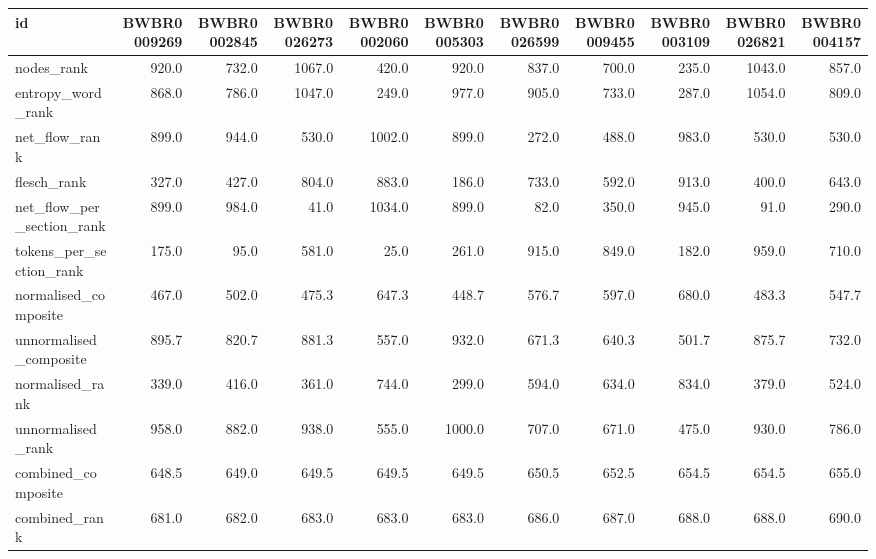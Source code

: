 \begin{tabular}{lrrrrrrrrrr}
\toprule
id & BWBR0009269 & BWBR0002845 & BWBR0026273 & BWBR0002060 & BWBR0005303 & BWBR0026599 & BWBR0009455 & BWBR0003109 & BWBR0026821 & BWBR0004157 \\
\midrule
nodes\_rank & 920.0 & 732.0 & 1067.0 & 420.0 & 920.0 & 837.0 & 700.0 & 235.0 & 1043.0 & 857.0 \\
\cline{1-11}
entropy\_word\_rank & 868.0 & 786.0 & 1047.0 & 249.0 & 977.0 & 905.0 & 733.0 & 287.0 & 1054.0 & 809.0 \\
\cline{1-11}
net\_flow\_rank & 899.0 & 944.0 & 530.0 & 1002.0 & 899.0 & 272.0 & 488.0 & 983.0 & 530.0 & 530.0 \\
\cline{1-11}
flesch\_rank & 327.0 & 427.0 & 804.0 & 883.0 & 186.0 & 733.0 & 592.0 & 913.0 & 400.0 & 643.0 \\
\cline{1-11}
net\_flow\_per\_section\_rank & 899.0 & 984.0 & 41.0 & 1034.0 & 899.0 & 82.0 & 350.0 & 945.0 & 91.0 & 290.0 \\
\cline{1-11}
tokens\_per\_section\_rank & 175.0 & 95.0 & 581.0 & 25.0 & 261.0 & 915.0 & 849.0 & 182.0 & 959.0 & 710.0 \\
\cline{1-11}
normalised\_composite & 467.0 & 502.0 & 475.3 & 647.3 & 448.7 & 576.7 & 597.0 & 680.0 & 483.3 & 547.7 \\
\cline{1-11}
unnormalised\_composite & 895.7 & 820.7 & 881.3 & 557.0 & 932.0 & 671.3 & 640.3 & 501.7 & 875.7 & 732.0 \\
\cline{1-11}
normalised\_rank & 339.0 & 416.0 & 361.0 & 744.0 & 299.0 & 594.0 & 634.0 & 834.0 & 379.0 & 524.0 \\
\cline{1-11}
unnormalised\_rank & 958.0 & 882.0 & 938.0 & 555.0 & 1000.0 & 707.0 & 671.0 & 475.0 & 930.0 & 786.0 \\
\cline{1-11}
combined\_composite & 648.5 & 649.0 & 649.5 & 649.5 & 649.5 & 650.5 & 652.5 & 654.5 & 654.5 & 655.0 \\
\cline{1-11}
combined\_rank & 681.0 & 682.0 & 683.0 & 683.0 & 683.0 & 686.0 & 687.0 & 688.0 & 688.0 & 690.0 \\
\cline{1-11}
\bottomrule
\end{tabular}
